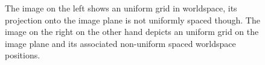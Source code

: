 \begin{figure}[h]
\centering
{}
\caption{The image on the left shows an uniform grid in worldspace,
its projection onto the image plane is not uniformly spaced though.
The image on the right on the other hand depicts an uniform grid on
the image plane and its associated non-uniform spaced worldspace
positions.}
\label{fig:dprojectedgrid}
\end{figure}
%

